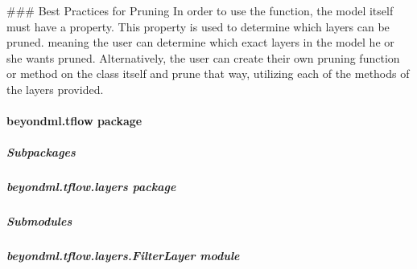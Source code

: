\documentclass[letterpaper,10pt,english]{sphinxmanual}
\begin{document}
\sphinxAtStartPar
\#\#\# Best Practices for Pruning
In order to use the  function, the model itself must have a  property. This property
is used to determine which layers can be pruned.  meaning the user can determine which exact layers in the model he or she wants
pruned. Alternatively, the user can create their own pruning function or method on the class itself and prune that way,
utilizing each of the  methods of the layers provided.

\sphinxstepscope


\paragraph{beyondml.tflow package}
\label{\detokenize{beyondml.tflow:beyondml-tflow-package}}\label{\detokenize{beyondml.tflow::doc}}

\subparagraph{Subpackages}
\label{\detokenize{beyondml.tflow:subpackages}}
\sphinxstepscope


\subparagraph{beyondml.tflow.layers package}
\label{\detokenize{beyondml.tflow.layers:beyondml-tflow-layers-package}}\label{\detokenize{beyondml.tflow.layers::doc}}

\subparagraph{Submodules}
\label{\detokenize{beyondml.tflow.layers:submodules}}

\subparagraph{beyondml.tflow.layers.FilterLayer module}
\label{\detokenize{beyondml.tflow.layers:module-beyondml.tflow.layers.FilterLayer}}\label{\detokenize{beyondml.tflow.layers:beyondml-tflow-layers-filterlayer-module}}
\end{document}

